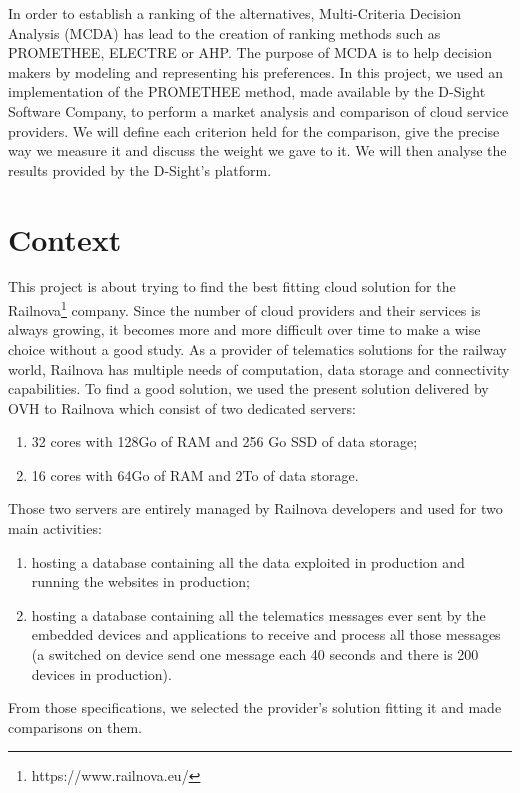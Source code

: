 \documentclass[a4paper,11pt]{article}
\begin{document}
In order to establish a ranking of the alternatives, Multi-Criteria Decision Analysis (MCDA) has lead to the creation of ranking methods such as PROMETHEE, ELECTRE or AHP. The purpose of MCDA is to help decision makers by modeling and representing his preferences. In this project, we used an implementation of the PROMETHEE method, made available by the D-Sight Software Company, to perform a market analysis and comparison of cloud service providers. We will define each criterion held for the comparison, give the precise way we measure it and discuss the weight we gave to it. We will then analyse the results provided by the D-Sight's platform.\\ %


\section{Context}
This project is about trying to find the best fitting cloud solution for the Railnova\footnote{https://www.railnova.eu/} company. Since the number of cloud providers and their services is always growing, it becomes more and more difficult over time to make a wise choice without a good study. As a provider of telematics solutions for the railway world, Railnova has multiple needs of computation, data storage and connectivity capabilities. To find a good solution, we used the present solution delivered by OVH to Railnova which consist of two dedicated servers:
\begin{enumerate}
  \item 32 cores with 128Go of RAM and 256 Go SSD of data storage;
  \item 16 cores with 64Go of RAM and 2To of data storage.
\end{enumerate}
Those two servers are entirely managed by Railnova developers and used for two main activities:
\begin{enumerate}
  \item hosting a database containing all the data exploited in production and running the websites in production;
  \item hosting a database containing all the telematics messages ever sent by the embedded devices and applications to receive and process all those messages (a switched on device send one message each 40 seconds and there is 200 devices in production).
\end{enumerate}
From those specifications, we selected the provider's solution fitting it and made comparisons on them.\\
\end{document}
